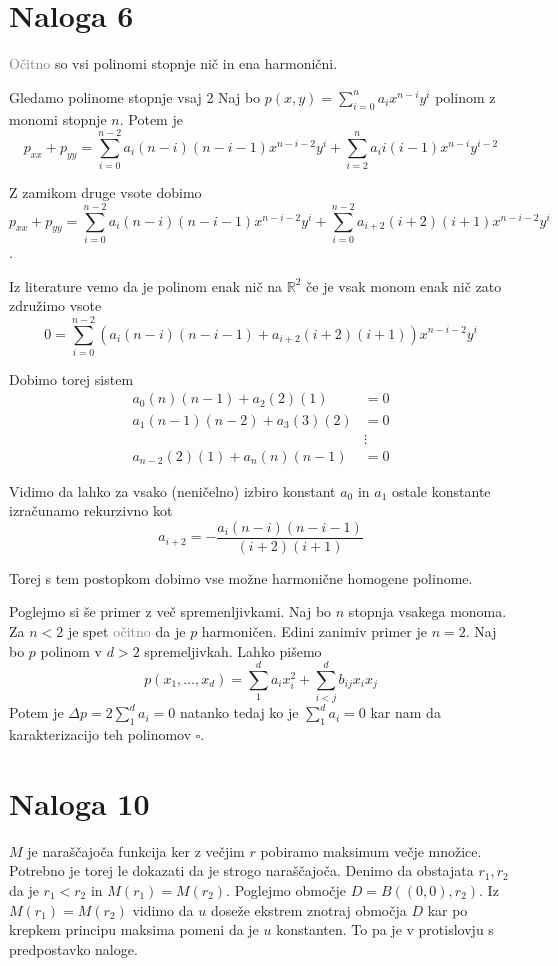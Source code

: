 \documentclass[12pt]{article}
\begin{document}
\section{Naloga 6}
\textcolor{gray}{Očitno} so vsi polinomi stopnje nič in ena harmonični.

Gledamo polinome stopnje vsaj 2
Naj bo $p(x,y)=\sum_{i=0}^n a_ix^{n-i}y^i$ polinom z monomi stopnje $n$. Potem je \[p_{xx}+p_{yy}=\sum_{i=0}^{n-2} a_i(n-i)(n-i-1)x^{n-i-2}y^i+\sum_{i=2}^n a_ii(i-1)x^{n-i}y^{i-2}\]

Z zamikom druge vsote dobimo \[p_{xx}+p_{yy}=\sum_{i=0}^{n-2} a_i(n-i)(n-i-1)x^{n-i-2}y^i+\sum_{i=0}^{n-2} a_{i+2}(i+2)(i+1)x^{n-i-2}y^i\].

Iz literature vemo da je polinom enak nič na $\mathbb{R}^2$ če je vsak monom enak nič zato združimo vsote
\[0 = \sum_{i=0}^{n-2} (a_i(n-i)(n-i-1) + a_{i+2}(i+2)(i+1))x^{n-i-2}y^i\]

Dobimo torej sistem
\begin{align*}
a_0(n)(n-1) + a_2(2)(1) &= 0\\
a_1(n-1)(n-2) + a_3(3)(2) &= 0\\
&\vdots\\
a_{n-2}(2)(1) + a_n(n)(n-1) &= 0
\end{align*}

Vidimo da lahko za vsako (neničelno) izbiro konstant $a_0$ in $a_1$ ostale konstante izračunamo rekurzivno kot
\[a_{i+2} = -\frac{a_i(n-i)(n-i-1)}{(i+2)(i+1)}\]

Torej s tem postopkom dobimo vse možne harmonične homogene polinome. 

Poglejmo si še primer z več spremenljivkami.
Naj bo $n$ stopnja vsakega monoma. 
Za $n<2$ je spet \textcolor{gray}{očitno} da je $p$ harmoničen. 
Edini zanimiv primer je $n=2$.
Naj bo $p$ polinom v $d>2$ spremeljivkah. Lahko pišemo \[p(x_1, \dots, x_d) = \sum_1^d a_ix_i^2 + \sum_{i<j}^d b_{ij}x_ix_j \]
Potem je $\Delta p = 2\sum_1^d a_i = 0$ natanko tedaj ko je $\sum_1^d a_i = 0$ kar nam da karakterizacijo teh polinomov $\square$.

\section{Naloga 10}

$M$ je naraščajoča funkcija ker z večjim $r$ pobiramo maksimum večje množice. Potrebno je torej le dokazati da je strogo naraščajoča. Denimo da obstajata
$r_1, r_2$ da je $r_1<r_2$ in $M(r_1)=M(r_2)$. Poglejmo območje $D=B((0,0), r_2)$. Iz $M(r_1)=M(r_2)$ vidimo da $u$ doseže ekstrem znotraj območja $D$
kar po krepkem principu maksima pomeni da je $u$ konstanten. To pa je v protislovju s predpostavko naloge. 
\end{document}
